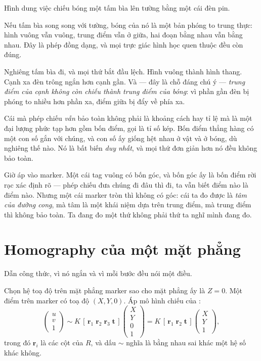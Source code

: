 \documentclass[../../marker.tex]{subfiles}
\begin{document}
\begin{trucgiac}
Hình dung việc chiếu bóng một tấm bìa lên tường bằng một cái đèn pin.

Nếu tấm bìa song song với tường, bóng của nó là một bản phóng to trung thực: hình vuông vẫn vuông, trung điểm vẫn ở giữa, hai đoạn bằng nhau vẫn bằng nhau. Đây là phép đồng dạng, và mọi trực giác hình học quen thuộc đều còn đúng.

Nghiêng tấm bìa đi, và mọi thứ bắt đầu lệch. Hình vuông thành hình thang. Cạnh xa đèn trông ngắn hơn cạnh gần. Và --- đây là chỗ đáng chú ý --- \emph{trung điểm của cạnh không còn chiếu thành trung điểm của bóng}: vì phần gần đèn bị phóng to nhiều hơn phần xa, điểm giữa bị đẩy về phía xa.

Cái mà phép chiếu \emph{vẫn} bảo toàn không phải là khoảng cách hay tỉ lệ mà là một đại lượng phức tạp hơn gồm bốn điểm, gọi là tỉ số kép. Bốn điểm thẳng hàng có một con số gắn với chúng, và con số ấy giống hệt nhau ở vật và ở bóng, dù nghiêng thế nào. Nó là bất biến \emph{duy nhất}, và mọi thứ đơn giản hơn nó đều không bảo toàn.

Giờ áp vào marker. Một cái tag vuông có bốn góc, và bốn góc ấy là bốn điểm rời rạc xác định rõ --- phép chiếu đưa chúng đi đâu thì đi, ta vẫn biết điểm nào là điểm nào. Nhưng một cái marker tròn thì không có góc: cái ta đo được là \emph{tâm của đường cong}, mà tâm là một khái niệm dựa trên trung điểm, mà trung điểm thì không bảo toàn. Ta đang đo một thứ không phải thứ ta nghĩ mình đang đo.
\end{trucgiac}

\section{Homography của một mặt phẳng}

Dẫn công thức, vì nó ngắn và vì mỗi bước đều nói một điều.

Chọn hệ toạ độ trên mặt phẳng marker sao cho mặt phẳng ấy là \(Z = 0\). Một điểm trên marker có toạ độ \((X, Y, 0)\). Áp mô hình chiếu của :
\[
\begin{pmatrix} u \\ v \\ 1\end{pmatrix}
\sim K\,[\,\mathbf{r}_1 \; \mathbf{r}_2 \; \mathbf{r}_3 \; \mathbf{t}\,]
\begin{pmatrix} X \\ Y \\ 0 \\ 1\end{pmatrix}
= K\,[\,\mathbf{r}_1 \; \mathbf{r}_2 \; \mathbf{t}\,]
\begin{pmatrix} X \\ Y \\ 1\end{pmatrix},
\]
trong đó \(\mathbf{r}_i\) là các cột của \(R\), và dấu \(\sim\) nghĩa là bằng nhau sai khác một hệ số khác không.
\end{document}
